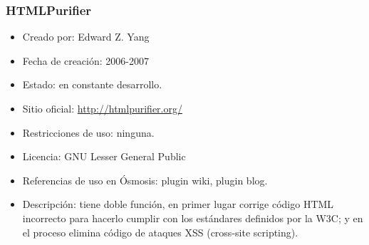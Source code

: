 \subsubsection{HTMLPurifier}
\begin{itemize}
	\item Creado por: Edward Z. Yang
	\item Fecha de creación: 2006-2007
	\item Estado: en constante desarrollo.
	\item Sitio oficial: \url{http://htmlpurifier.org/}
	\item Restricciones de uso: ninguna.
	\item Licencia: GNU Lesser General Public
	\item Referencias de uso en Ósmosis: plugin wiki, plugin blog.
	\item Descripción: tiene doble función, en primer lugar corrige código HTML incorrecto para hacerlo cumplir con los estándares definidos por la W3C; y en el proceso elimina código de ataques XSS (cross-site scripting).
\end{itemize}

